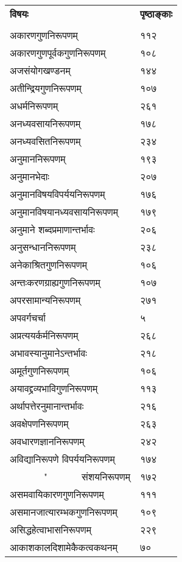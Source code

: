 \documentclass[11pt, openany]{book}
\begin{document}
\noindent
\begin{tabular}{m{28em} m{2em}}
\textbf{विषयः} & \textbf{पृष्ठाङ्काः}\\
 & \\
अकारणगुणनिरूपणम् & ११२\\
अकारणगुणपूर्वकगुणनिरूपणम् & १०८\\
अजसंयोगखण्डनम् & १४४\\
अतीन्द्रियगुणनिरूपणम् & १०७\\
अधर्मनिरूपणम् & २६१\\
अनध्यवसायनिरूपणम् & १७८\\
अनध्यवसितनिरूपणम् & २३४\\
अनुमाननिरूपणम् & १९३\\
अनुमानभेदाः & २०७\\
अनुमानविषयविपर्ययनिरूपणम् & १७६\\
अनुमानविषयानध्यवसायनिरूपणम् & १७९\\
अनुमाने शब्दप्रमाणान्तर्भावः & २०६\\
अनुसन्धाननिरूपणम् & २३८\\
अनेकाश्रितगुणनिरूपणम् & १०६\\
अन्तःकरणग्राह्यगुणनिरूपणम् & १०७\\
अपरसामान्यनिरूपणम् & २७१\\
अपवर्गचर्चा & ५\\
अप्रत्ययर्कर्मनिरूपणम् & २६८\\
अभावस्यानुमानेऽन्तर्भावः & २१८\\
अमूर्तगुणनिरूपणम् & १०६\\
अयावद्द्रव्यभाविगुणनिरूपणम् & ११३\\
अर्थापत्तेरनुमानान्तर्भावः & २१६\\
अवक्षेपणनिरूपणम् & २६३\\
अवधारणज्ञाननिरूपणम् & २४२\\
अविद्यानिरूपणे विपर्ययनिरूपणम् & १७४\\
~~~~~~~"~~~~~~~संशयनिरूपणम् & १७२\\
असमवायिकारणगुणनिरूपणम् & १११\\
असमानजात्यारम्भकगुणनिरूपणम् & १०९\\
असिद्धहेत्वाभासनिरूपणम् & २२९\\
आकाशकालदिशामेकैकत्वकथनम् & ७०
\end{tabular}
\end{document}
